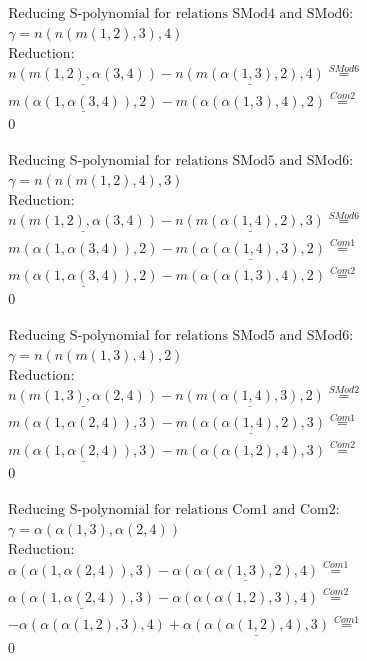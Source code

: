 \documentclass[11pt]{amsart}
\begin{document}
\begin{align*} 
& \text{Reducing S-polynomial for relations SMod4 and SMod6:} \\ 
& \gamma = n(n(m(1,2),3),4) \\ 
& \text{Reduction}: \\&\underline{n(m(1,2),\alpha(3,4))} - \underline{n(m(\alpha(1,3),2),4)} \stackrel{ SMod6 }{=}  \\ 
&\underline{m(\alpha(1,\alpha(3,4)),2)} - m(\alpha(\alpha(1,3),4),2) \stackrel{ Com2 }{=}  \\ 
&0\\ 
\end{align*} 
 
\begin{align*} 
& \text{Reducing S-polynomial for relations SMod5 and SMod6:} \\ 
& \gamma = n(n(m(1,2),4),3) \\ 
& \text{Reduction}: \\&\underline{n(m(1,2),\alpha(3,4))} - \underline{n(m(\alpha(1,4),2),3)} \stackrel{ SMod6 }{=}  \\ 
&m(\alpha(1,\alpha(3,4)),2) - \underline{m(\alpha(\alpha(1,4),3),2)} \stackrel{ Com1 }{=}  \\ 
&\underline{m(\alpha(1,\alpha(3,4)),2)} - m(\alpha(\alpha(1,3),4),2) \stackrel{ Com2 }{=}  \\ 
&0\\ 
\end{align*} 
 
\begin{align*} 
& \text{Reducing S-polynomial for relations SMod5 and SMod6:} \\ 
& \gamma = n(n(m(1,3),4),2) \\ 
& \text{Reduction}: \\&\underline{n(m(1,3),\alpha(2,4))} - \underline{n(m(\alpha(1,4),3),2)} \stackrel{ SMod2 }{=}  \\ 
&m(\alpha(1,\alpha(2,4)),3) - \underline{m(\alpha(\alpha(1,4),2),3)} \stackrel{ Com1 }{=}  \\ 
&\underline{m(\alpha(1,\alpha(2,4)),3)} - m(\alpha(\alpha(1,2),4),3) \stackrel{ Com2 }{=}  \\ 
&0\\ 
\end{align*} 
 
\begin{align*} 
& \text{Reducing S-polynomial for relations Com1 and Com2:} \\ 
& \gamma = \alpha(\alpha(1,3),\alpha(2,4)) \\ 
& \text{Reduction}: \\&\alpha(\alpha(1,\alpha(2,4)),3) - \underline{\alpha(\alpha(\alpha(1,3),2),4)} \stackrel{ Com1 }{=}  \\ 
&\underline{\alpha(\alpha(1,\alpha(2,4)),3)} - \alpha(\alpha(\alpha(1,2),3),4) \stackrel{ Com2 }{=}  \\ 
& - \alpha(\alpha(\alpha(1,2),3),4) + \underline{\alpha(\alpha(\alpha(1,2),4),3)} \stackrel{ Com1 }{=}  \\ 
&0\\ 
\end{align*} 
 
\end{document}
